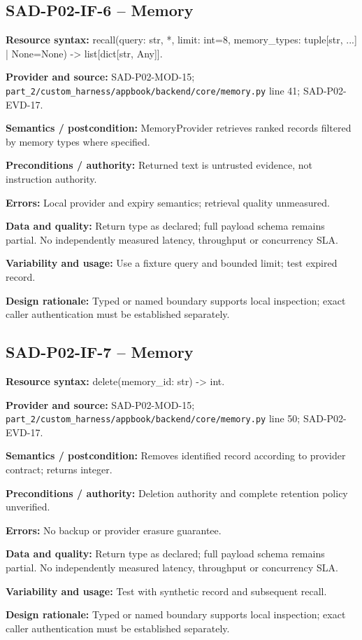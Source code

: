 \documentclass[10pt,letterpaper]{article}
\begin{document}
\subsection{SAD-P02-IF-6 -- Memory}
{\raggedright \textbf{Resource syntax:} recall(\allowbreak{}query: str, *, limit: int=8, memory\_\allowbreak{}types: tuple[str, ...] | None=None) -> list[dict[str, Any]].\par}
\textbf{Provider and source:} SAD-P02-MOD-15; \nolinkurl{part_2/custom_harness/appbook/backend/core/memory.py} line 41; SAD-P02-EVD-17.\par
\textbf{Semantics / postcondition:} MemoryProvider retrieves ranked records filtered by memory types where specified.\par
\textbf{Preconditions / authority:} Returned text is untrusted evidence, not instruction authority.\par
\textbf{Errors:} Local provider and expiry semantics; retrieval quality unmeasured.\par
\textbf{Data and quality:} Return type as declared; full payload schema remains partial. No independently measured latency, throughput or concurrency SLA.\par
\textbf{Variability and usage:} Use a fixture query and bounded limit; test expired record.\par
\textbf{Design rationale:} Typed or named boundary supports local inspection; exact caller authentication must be established separately.\par

\subsection{SAD-P02-IF-7 -- Memory}
{\raggedright \textbf{Resource syntax:} delete(\allowbreak{}memory\_\allowbreak{}id: str) -> int.\par}
\textbf{Provider and source:} SAD-P02-MOD-15; \nolinkurl{part_2/custom_harness/appbook/backend/core/memory.py} line 50; SAD-P02-EVD-17.\par
\textbf{Semantics / postcondition:} Removes identified record according to provider contract; returns integer.\par
\textbf{Preconditions / authority:} Deletion authority and complete retention policy unverified.\par
\textbf{Errors:} No backup or provider erasure guarantee.\par
\textbf{Data and quality:} Return type as declared; full payload schema remains partial. No independently measured latency, throughput or concurrency SLA.\par
\textbf{Variability and usage:} Test with synthetic record and subsequent recall.\par
\textbf{Design rationale:} Typed or named boundary supports local inspection; exact caller authentication must be established separately.\par
\end{document}
